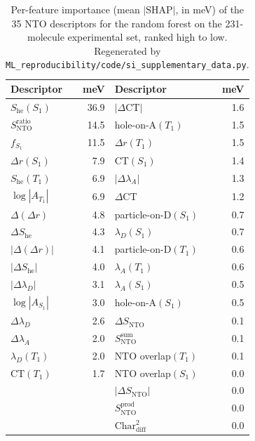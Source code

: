 \documentclass[twoside,twocolumn,9pt]{extarticle}
\begin{document}
\begin{table}[htbp]
  \centering
  \caption{Per-feature importance (mean $|\text{SHAP}|$, in meV) of the \num{35}
    NTO descriptors for the random forest on the \num{231}-molecule experimental
    set, ranked high to low. Regenerated by
    \texttt{ML\_reproducibility/code/si\_supplementary\_data.py}.}
  \label{tab:shap}
  \footnotesize
  \begin{tabular}{lr@{\hskip 2em}lr}
    \toprule
    Descriptor & meV & Descriptor & meV \\
    \midrule
    $S_\text{he}(S_1)$        & 36.9 & $|\Delta\text{CT}|$            & 1.6 \\
    $S_\text{NTO}^{\text{ratio}}$ & 14.5 & hole-on-A$(T_1)$          & 1.5 \\
    $f_{S_1}$                 & 11.5 & $\Delta r(T_1)$               & 1.5 \\
    $\Delta r(S_1)$           &  7.9 & $\text{CT}(S_1)$              & 1.4 \\
    $S_\text{he}(T_1)$        &  6.9 & $|\Delta\lambda_A|$          & 1.3 \\
    $\log|A_{T_1}|$           &  6.9 & $\Delta\text{CT}$            & 1.2 \\
    $\Delta(\Delta r)$        &  4.8 & particle-on-D$(S_1)$         & 0.7 \\
    $\Delta S_\text{he}$      &  4.3 & $\lambda_D(S_1)$             & 0.7 \\
    $|\Delta(\Delta r)|$      &  4.1 & particle-on-D$(T_1)$         & 0.6 \\
    $|\Delta S_\text{he}|$    &  4.0 & $\lambda_A(T_1)$             & 0.6 \\
    $|\Delta\lambda_D|$       &  3.1 & $\lambda_A(S_1)$             & 0.5 \\
    $\log|A_{S_1}|$           &  3.0 & hole-on-A$(S_1)$             & 0.5 \\
    $\Delta\lambda_D$         &  2.6 & $\Delta S_\text{NTO}$        & 0.1 \\
    $\Delta\lambda_A$         &  2.0 & $S_\text{NTO}^{\text{sum}}$  & 0.1 \\
    $\lambda_D(T_1)$          &  2.0 & NTO overlap$(T_1)$           & 0.1 \\
    $\text{CT}(T_1)$          &  1.7 & NTO overlap$(S_1)$           & 0.0 \\
    \multicolumn{2}{l}{} & $|\Delta S_\text{NTO}|$         & 0.0 \\
    \multicolumn{2}{l}{} & $S_\text{NTO}^{\text{prod}}$    & 0.0 \\
    \multicolumn{2}{l}{} & $\text{Char}_\text{diff}^2$    & 0.0 \\
    \bottomrule
  \end{tabular}
\end{table}
\end{document}
